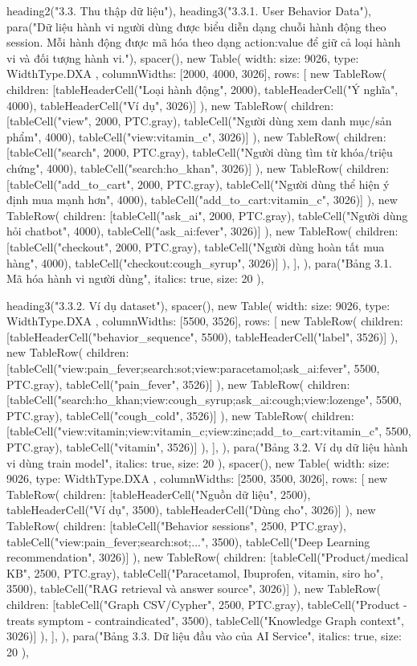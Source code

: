   heading2("3.3. Thu thập dữ liệu"),
  heading3("3.3.1. User Behavior Data"),
  para("Dữ liệu hành vi người dùng được biểu diễn dạng chuỗi hành động theo session. Mỗi hành động được mã hóa theo dạng action:value để giữ cả loại hành vi và đối tượng hành vi."),
  spacer(),
  new Table({
    width: { size: 9026, type: WidthType.DXA },
    columnWidths: [2000, 4000, 3026],
    rows: [
      new TableRow({ children: [tableHeaderCell("Loại hành động", 2000), tableHeaderCell("Ý nghĩa", 4000), tableHeaderCell("Ví dụ", 3026)] }),
      new TableRow({ children: [tableCell("view", 2000, PTC.gray), tableCell("Người dùng xem danh mục/sản phẩm", 4000), tableCell("view:vitamin_c", 3026)] }),
      new TableRow({ children: [tableCell("search", 2000, PTC.gray), tableCell("Người dùng tìm từ khóa/triệu chứng", 4000), tableCell("search:ho_khan", 3026)] }),
      new TableRow({ children: [tableCell("add_to_cart", 2000, PTC.gray), tableCell("Người dùng thể hiện ý định mua mạnh hơn", 4000), tableCell("add_to_cart:vitamin_c", 3026)] }),
      new TableRow({ children: [tableCell("ask_ai", 2000, PTC.gray), tableCell("Người dùng hỏi chatbot", 4000), tableCell("ask_ai:fever", 3026)] }),
      new TableRow({ children: [tableCell("checkout", 2000, PTC.gray), tableCell("Người dùng hoàn tất mua hàng", 4000), tableCell("checkout:cough_syrup", 3026)] }),
    ],
  }),
  para("Bảng 3.1. Mã hóa hành vi người dùng", { italics: true, size: 20 }),

  heading3("3.3.2. Ví dụ dataset"),
  spacer(),
  new Table({
    width: { size: 9026, type: WidthType.DXA },
    columnWidths: [5500, 3526],
    rows: [
      new TableRow({ children: [tableHeaderCell("behavior_sequence", 5500), tableHeaderCell("label", 3526)] }),
      new TableRow({ children: [tableCell("view:pain_fever;search:sot;view:paracetamol;ask_ai:fever", 5500, PTC.gray), tableCell("pain_fever", 3526)] }),
      new TableRow({ children: [tableCell("search:ho_khan;view:cough_syrup;ask_ai:cough;view:lozenge", 5500, PTC.gray), tableCell("cough_cold", 3526)] }),
      new TableRow({ children: [tableCell("view:vitamin;view:vitamin_c;view:zinc;add_to_cart:vitamin_c", 5500, PTC.gray), tableCell("vitamin", 3526)] }),
    ],
  }),
  para("Bảng 3.2. Ví dụ dữ liệu hành vi dùng train model", { italics: true, size: 20 }),
  spacer(),
  new Table({
    width: { size: 9026, type: WidthType.DXA },
    columnWidths: [2500, 3500, 3026],
    rows: [
      new TableRow({ children: [tableHeaderCell("Nguồn dữ liệu", 2500), tableHeaderCell("Ví dụ", 3500), tableHeaderCell("Dùng cho", 3026)] }),
      new TableRow({ children: [tableCell("Behavior sessions", 2500, PTC.gray), tableCell("view:pain_fever;search:sot;...", 3500), tableCell("Deep Learning recommendation", 3026)] }),
      new TableRow({ children: [tableCell("Product/medical KB", 2500, PTC.gray), tableCell("Paracetamol, Ibuprofen, vitamin, siro ho", 3500), tableCell("RAG retrieval và answer source", 3026)] }),
      new TableRow({ children: [tableCell("Graph CSV/Cypher", 2500, PTC.gray), tableCell("Product - treats symptom - contraindicated", 3500), tableCell("Knowledge Graph context", 3026)] }),
    ],
  }),
  para("Bảng 3.3. Dữ liệu đầu vào của AI Service", { italics: true, size: 20 }),

